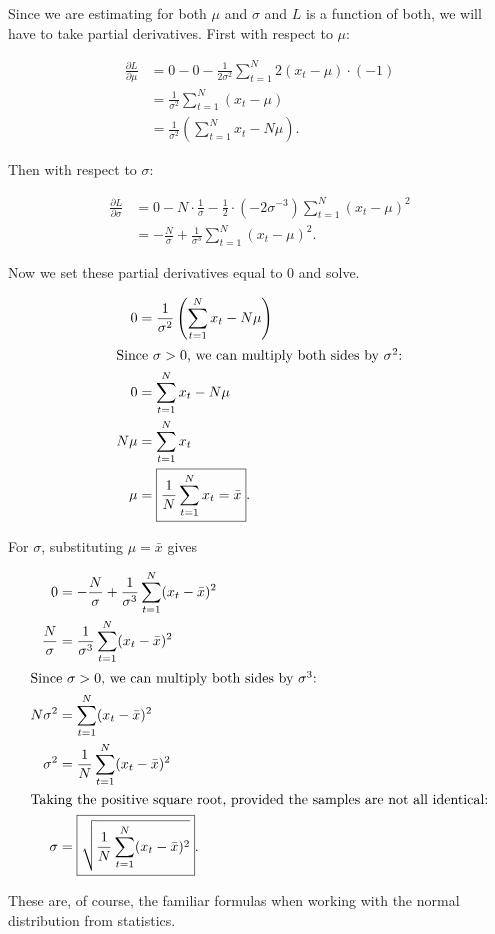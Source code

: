 \documentclass[12pt]{article}
\begin{document}
\begin{enumerate}
Since we are estimating for both $\mu$ and $\sigma$ and $L$ is a function of both, we will have to take partial derivatives. First with respect to $\mu$: 

\[
\begin{aligned}
\frac{\partial L}{\partial\mu}
&= 0 - 0 - \frac{1}{2\sigma^2}\sum_{t=1}^N 2(x_t-\mu)\cdot(-1) \\
&= \frac{1}{\sigma^2}\sum_{t=1}^N (x_t-\mu) \\
&= \frac{1}{\sigma^2}\left(\sum_{t=1}^N x_t-N\mu\right).
\end{aligned}
\]

Then with respect to $\sigma$:

\[
\begin{aligned}
\frac{\partial L}{\partial\sigma}
&= 0 - N\cdot\frac{1}{\sigma}
   - \frac{1}{2}\cdot(-2\sigma^{-3})\sum_{t=1}^N (x_t-\mu)^2 \\
&= -\frac{N}{\sigma} + \frac{1}{\sigma^3}\sum_{t=1}^N (x_t-\mu)^2.
\end{aligned}
\]

Now we set these partial derivatives equal to 0 and solve. 

\begin{align*}
0 &= \frac{1}{\sigma^2}\left(\sum_{t=1}^N x_t-N\mu\right) \\
\intertext{Since $\sigma>0$, we can multiply both sides by $\sigma^2$:}
0 &= \sum_{t=1}^N x_t-N\mu \\
N\mu &= \sum_{t=1}^N x_t \\
\mu &= \boxed{\frac{1}{N}\sum_{t=1}^N x_t = \bar{x}}.
\end{align*}

For $\sigma$, substituting $\mu=\bar{x}$ gives

\begin{align*}
0 &= -\frac{N}{\sigma} + \frac{1}{\sigma^3}\sum_{t=1}^N (x_t-\bar{x})^2 \\
\frac{N}{\sigma} &= \frac{1}{\sigma^3}\sum_{t=1}^N (x_t-\bar{x})^2 \\
\intertext{Since $\sigma>0$, we can multiply both sides by $\sigma^3$:}
N\sigma^2 &= \sum_{t=1}^N (x_t-\bar{x})^2 \\
\sigma^2 &= \frac{1}{N}\sum_{t=1}^N (x_t-\bar{x})^2 \\
\intertext{Taking the positive square root, provided the samples are not all identical:}
\sigma &= \boxed{\sqrt{\frac{1}{N}\sum_{t=1}^N (x_t-\bar{x})^2}}.
\end{align*} 

These are, of course, the familiar formulas when working with the normal distribution from statistics.


\end{enumerate}
\end{document}
